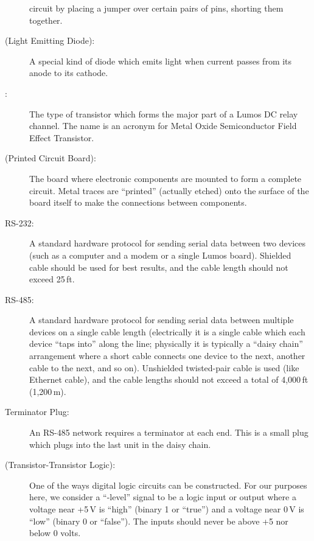 \documentclass[letterpaper,twoside,onecolumn,openright,final]{memoir}
\begin{document}
\begin{description}
		circuit by placing a jumper over certain pairs of pins, shorting them together.
	\item[\acronym{LED} (Light Emitting Diode):]
		A special kind of diode which emits light when current passes from its anode to its cathode.
	\item[\acronym{MOSFET}:]
		The type of transistor which forms the major part of a Lumos DC relay channel.  The name
		is an acronym for Metal Oxide Semiconductor Field Effect Transistor.
	\item[\acronym{PCB} (Printed Circuit Board):]
		The board where electronic components are mounted to form a complete circuit.  Metal
		traces are ``printed'' (actually etched) onto the surface of the board itself to make the
		connections between components.
	\item[RS-232:]
		A standard hardware protocol for sending serial data between two devices (such as a computer
		and a modem or a single Lumos board).  Shielded cable should be used for best results, and
		the cable length should not exceed 25\,ft.
	\item[RS-485:]
		A standard hardware protocol for sending serial data between multiple devices on a single
		cable length (electrically it is a single cable which each device ``taps into'' along the
		line; physically it is typically a ``daisy chain'' arrangement where a short cable connects
		one device to the next, another cable to the next, and so on). Unshielded twisted-pair cable
		is used (like Ethernet cable), and the cable lengths should not exceed a total of 4,000\,ft
		(1,200\,m).
	\item[Terminator Plug:]
		An RS-485 network requires a terminator at each end.  This is a small plug which plugs into
		the last unit in the daisy chain.
	\item[\acronym{TTL} (Transistor-Transistor Logic):] One of the ways digital logic circuits can be
		constructed.  For our purposes here, we consider a ``-level'' signal to be a
		logic input or output where a voltage near +5\,V is ``high'' (binary 1 or ``true'') and a
		voltage near 0\,V is ``low'' (binary 0 or ``false'').  The inputs should never be above
		+5 nor below 0 volts.
\end{description}



\indexintoc
\printindex
\clearpage


\end{document}
